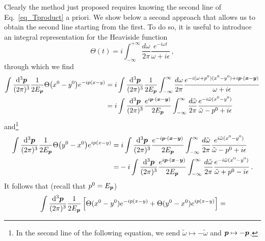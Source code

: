\begin{sol}
    Clearly the method just proposed requires knowing the second line of Eq.~\eqref{eq_Tproduct} a priori. We show below a second approach that allows us to obtain the second line starting from the first. To do so, it is useful to introduce an integral representation for the Heaviside function
    \begin{equation}
        \Theta(t)
        = i \int_{-\infty}^{+ \infty} \frac{d\omega}{2\pi} \frac{e^{-i \omega t}}{\omega + i \epsilon} \, ,
    \end{equation}
    through which we find
    \begin{equation}
    \begin{split}
        \int \frac{{\rm d}^{3}\boldsymbol{p}}{(2\pi)^{3}}\frac{1}{2E_{\boldsymbol{p}}} \Theta\big(x^0 - y^0\big)e^{-ip(x-y)} 
        = &\; i \int \frac{{\rm d}^{3}\boldsymbol{p}}{(2\pi)^{3}}\frac{1}{2E_{\boldsymbol{p}}} \int_{-\infty}^{\infty} \frac{d\omega}{2\pi} \frac{e^{-i (\omega + p^0) (x^0 - y^0) + i \boldsymbol{p}\cdot(\boldsymbol{x}-\boldsymbol{y})}}{\omega + i \epsilon} \\
        = &\; i \int \frac{{\rm d}^{3}\boldsymbol{p}}{(2\pi)^{3}} \frac{e^{i \boldsymbol{p}\cdot(\boldsymbol{x}-\boldsymbol{y})}}{2E_{\boldsymbol{p}}} \int_{-\infty}^{\infty} \frac{d\tilde{\omega}}{2\pi} \frac{e^{-i \tilde{\omega} (x^0 - y^0)}}{\tilde{\omega} - p^0 + i \epsilon}
    \end{split}
    \end{equation}
    and\footnote{In the second line of the following equation, we send $\tilde{\omega} \mapsto - \tilde{\omega}$ and $\boldsymbol{p} \mapsto - \boldsymbol{p}$.}
    \begin{equation}
    \begin{split}
        \int \frac{{\rm d}^{3}\boldsymbol{p}}{(2\pi)^{3}}\frac{1}{2E_{\boldsymbol{p}}} \Theta\big(y^0 - x^0\big)e^{ip(x-y)} 
        = &\; i \int \frac{{\rm d}^{3}\boldsymbol{p}}{(2\pi)^{3}} \frac{e^{-i \boldsymbol{p}\cdot(\boldsymbol{x}-\boldsymbol{y})}}{2E_{\boldsymbol{p}}} \int_{-\infty}^{\infty} \frac{d\tilde{\omega}}{2\pi} \frac{e^{i \tilde{\omega} (x^0 - y^0)}}{\tilde{\omega} - p^0 + i \epsilon} \\
        = & - i \int \frac{{\rm d}^{3}\boldsymbol{p}}{(2\pi)^{3}} \frac{e^{i \boldsymbol{p}\cdot(\boldsymbol{x}-\boldsymbol{y})}}{2E_{\boldsymbol{p}}} \int_{-\infty}^{\infty} \frac{d\tilde{\omega}}{2\pi} \frac{e^{-i \tilde{\omega} (x^0 - y^0)}}{\tilde{\omega} + p^0 - i \epsilon} \, .
    \end{split}
    \end{equation}
    It follows that (recall that $p^0 = E_{\boldsymbol{p}}$)
    \begin{equation}
    \begin{split}
        & \int \frac{\rmd^{3}\vp}{(2\pi)^{3}}\frac{1}{2\Ep} \left[\Theta(x^0 - y^0)e^{-ip(x-y)} + \Theta(y^0 - x^0) e^{ip(x-y)}\right] = \\

\end{split}
\end{equation}
\end{sol}
